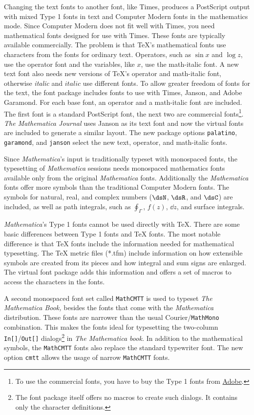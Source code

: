 \documentclass{article}
\newcommand{\Janson}[1]{{\fontfamily{pjn}\fontencoding{T1}%
\fontshape{n}\selectfont #1}}
\newcommand{\Garamond}[1]{{\fontfamily{pad}\fontencoding{T1}%
\fontshape{n}\selectfont #1}}
\newcommand{\Times}[1]{{\fontfamily{ptm}\fontencoding{T1}%
\fontshape{n}\selectfont #1}}
\newcommand{\cmtt}{\texttt{MathCMTT}\xspace}
\newcommand{\mono}{\texttt{MathMono}\xspace}
\newcommand{\Math}{\textit{Mathematica}\xspace}
\begin{document}
Changing the text fonts to another font, like Times, produces a
PostScript output with mixed Type 1 fonts in text and Computer Modern
fonts in the mathematics mode.  Since Computer Modern does not fit
well with Times, you need mathematical fonts designed for use with
Times. These fonts are typically available commercially. The problem
is that \TeX{}'s mathematical fonts use characters from the fonts for
ordinary text. Operators, such as $\sin x$ and $\log z$, use the
operator font and the variables, like $x$, use the math-italic font. A
new text font also needs new versions of \TeX{}'s operator and
math-italic font, otherwise \textit{italic} and $italic$ use different
fonts.  To allow greater freedom of fonts for the text, the font
package includes fonts to use with \Times{Times}, \Janson{Janson}, and
\Garamond{Adobe Garamond}. For each base font, an operator and a
math-italic font are included. The first font is a standard PostScript
font, the next two are commercial fonts\footnote{To use the commercial
fonts, you have to buy the Type 1 fonts from
\href{http://www.adobe.com}{Adobe}.}.  \textit{The Mathematica
Journal} uses \Janson{Janson} as its text font and now the virtual
fonts are included to generate a similar layout. The new package
options \texttt{palatino}, \texttt{garamond}, and \texttt{janson}
select the new text, operator, and math-italic fonts.

Since \Math's input is traditionally typeset with monospaced
fonts, the typesetting of \Math sessions needs monospaced
mathematics fonts available only from the original \Math fonts.
Additionally the \Math fonts offer more symbols than the
traditional Computer Modern fonts. The symbols for natural, real, and
complex numbers ($\dsN$, $\dsR$, and $\dsC$) are included, as well as
path integrals, such as $\oint_\Gamma$, $f(z)$, $\dd z$, and surface
integrals.

\Math's Type 1 fonts cannot be used directly with \TeX.  There are
some basic differences between Type 1 fonts and \TeX{} fonts. The most
notable difference is that \TeX{} fonts include the information needed
for mathematical typesetting.  The \TeX{} metric files
(\textsf{*.tfm}) include information on how extensible symbols are
created from its pieces and how integral and sum signs are enlarged.
The virtual font package adds this information and offers a set of
macros to access the characters in the fonts.

A second monospaced font set called \cmtt is used to typeset
\textit{The \Math{} Book,} besides the fonts that come with the \Math{}
distribution.  These fonts are narrower than the usual Courier/\mono
combination. This makes the fonts ideal for typesetting the two-column
\texttt{In[]}/\texttt{Out[]} dialogs\footnote{ The font package itself
offers no macros to create such dialogs.  It contains only the
character definitions.}  in \textit{The Mathematica book.} In addition
to the mathematical symbols, the \cmtt fonts also replace the standard
typewriter font.  The new option \texttt{cmtt} allows the usage
of narrow \cmtt fonts.
\end{document}
